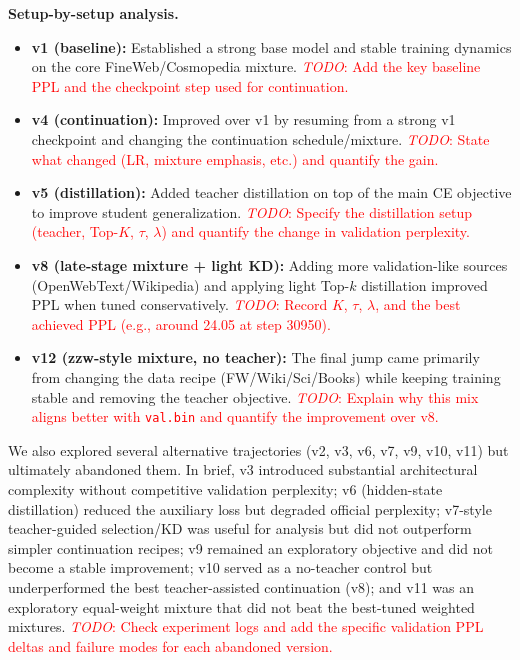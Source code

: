 \documentclass{article}
\renewcommand{\todo}[1]{\textcolor{red}{\emph{TODO}: #1}}
\begin{document}
\textbf{Setup-by-setup analysis.} 
\begin{itemize}
    \item \textbf{v1 (baseline):} Established a strong base model and stable training dynamics on the core FineWeb/Cosmopedia mixture. \todo{Add the key baseline PPL and the checkpoint step used for continuation.}
    \item \textbf{v4 (continuation):} Improved over v1 by resuming from a strong v1 checkpoint and changing the continuation schedule/mixture. \todo{State what changed (LR, mixture emphasis, etc.) and quantify the gain.}
    \item \textbf{v5 (distillation):} Added teacher distillation on top of the main CE objective to improve student generalization. \todo{Specify the distillation setup (teacher, Top-$K$, $\tau$, $\lambda$) and quantify the change in validation perplexity.}
    \item \textbf{v8 (late-stage mixture + light KD):} Adding more validation-like sources (OpenWebText/Wikipedia) and applying light Top-$k$ distillation improved PPL when tuned conservatively. \todo{Record $K$, $\tau$, $\lambda$, and the best achieved PPL (e.g., around 24.05 at step 30950).}
    \item \textbf{v12 (zzw-style mixture, no teacher):} The final jump came primarily from changing the data recipe (FW/Wiki/Sci/Books) while keeping training stable and removing the teacher objective. \todo{Explain why this mix aligns better with \texttt{val.bin} and quantify the improvement over v8.}
\end{itemize}
We also explored several alternative trajectories (v2, v3, v6, v7, v9, v10, v11) but ultimately abandoned them. In brief, v3 introduced substantial architectural complexity without competitive validation perplexity; v6 (hidden-state distillation) reduced the auxiliary loss but degraded official perplexity; v7-style teacher-guided selection/KD was useful for analysis but did not outperform simpler continuation recipes; v9 remained an exploratory objective and did not become a stable improvement; v10 served as a no-teacher control but underperformed the best teacher-assisted continuation (v8); and v11 was an exploratory equal-weight mixture that did not beat the best-tuned weighted mixtures. \todo{Check experiment logs and add the specific validation PPL deltas and failure modes for each abandoned version.}



% 
% 
\end{document}
